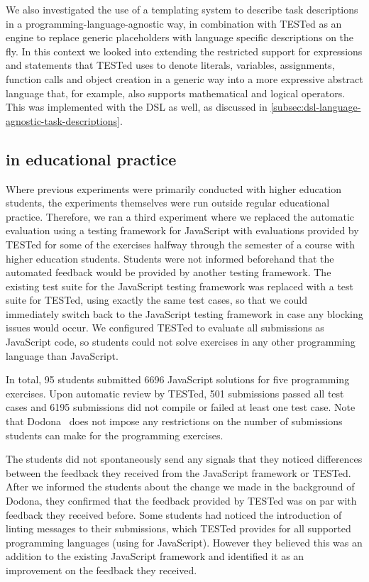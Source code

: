 \documentclass[../main]{subfiles}
\begin{document}
We also investigated the use of a templating system to describe task descriptions in a programming-language-agnostic way, in combination with TESTed as an engine to replace generic placeholders with language specific descriptions on the fly.
In this context we looked into extending the restricted support for expressions and statements that TESTed uses to denote literals, variables, assignments, function calls and object creation in a generic way into a more expressive abstract language that, for example, also supports mathematical and logical operators.
This was implemented with the DSL as well, as discussed in \cref{subsec:dsl-language-agnostic-task-descriptions}.

\subsection{\tested{} in educational practice}\label{subsec:tested-in-educational-practice}

Where previous experiments were primarily conducted with higher education students, the experiments themselves were run outside regular educational practice.
Therefore, we ran a third experiment where we replaced the automatic evaluation using a testing framework for JavaScript with evaluations provided by TESTed for some of the exercises halfway through the semester of a course with higher education students.
Students were not informed beforehand that the automated feedback would be provided by another testing framework.
The existing test suite for the JavaScript testing framework was replaced with a test suite for TESTed, using exactly the same test cases, so that we could immediately switch back to the JavaScript testing framework in case any blocking issues would occur.
We configured TESTed to evaluate all submissions as JavaScript code, so students could not solve exercises in any other programming language than JavaScript.

In total, \num{95} students submitted \num{6696} JavaScript solutions for five programming exercises.
Upon automatic review by TESTed, \num{501} submissions passed all test cases and \num{6195} submissions did not compile or failed at least one test case.
Note that Dodona~\autocite{vanpetegemDodonaLearnCode2023} does not impose any restrictions on the number of submissions students can make for the programming exercises.

The students did not spontaneously send any signals that they noticed differences between the feedback they received from the JavaScript framework or TESTed.
After we informed the students about the change we made in the background of Dodona, they confirmed that the feedback provided by TESTed was on par with feedback they received before.
Some students had noticed the introduction of linting messages to their submissions, which TESTed provides for all supported programming languages (using  for JavaScript).
However they believed this was an addition to the existing JavaScript framework and identified it as an improvement on the feedback they received.
\end{document}
